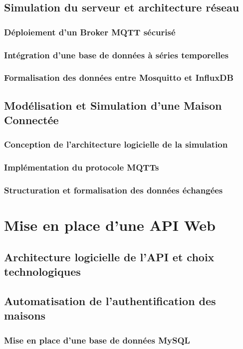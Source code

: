 \documentclass[10pt, a4paper]{report}
\begin{document}
	\subsection{Simulation du serveur et architecture réseau}
	\subsubsection{Déploiement d'un Broker MQTT sécurisé}
	\subsubsection{Intégration d'une base de données à séries temporelles}
	\subsubsection{Formalisation des données entre Mosquitto et InfluxDB}
	
	\subsection{Modélisation et Simulation d'une Maison Connectée}
	\subsubsection{Conception de l'architecture logicielle de la simulation}
	\subsubsection{Implémentation du protocole MQTTs}
	\subsubsection{Structuration et formalisation des données échangées}
	
	\section{Mise en place d'une API Web}
	\subsection{Architecture logicielle de l'API et choix technologiques}
	\subsection{Automatisation de l'authentification des maisons}
	\subsubsection{Mise en place d'une base de données MySQL}
\end{document}
